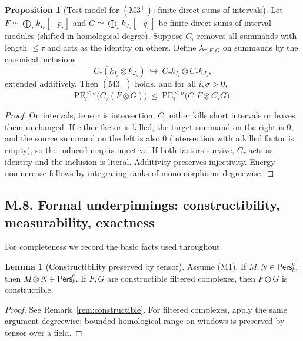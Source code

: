 \documentclass[11pt]{article}
\numberwithin{equation}{section}
\theoremstyle{plain}
\theoremstyle{definition}
\theoremstyle{remark}
\newcommand{\Pers}{\mathsf{Pers}}
\theoremstyle{plain}
\theoremstyle{definition}
\newcommand{\kk}{k}
\newcommand{\PE}{\mathrm{PE}}
\newcommand{\CT}{C_{\tau}}
\numberwithin{equation}{section}
\newtheorem{proposition}[theorem]{Proposition}
\newtheorem{lemma}[theorem]{Lemma}
\theoremstyle{definition}
\numberwithin{equation}{section}
\theoremstyle{plain}
\theoremstyle{definition}
\theoremstyle{remark}
\begin{document}
\begin{proposition}[Test model for \((\mathrm{M3}^+)\): finite direct sums of intervals]\label{prop:test-m3plus}
Let \(F\simeq \bigoplus_r \kk_{I_r}[-p_r]\) and \(G\simeq \bigoplus_s \kk_{J_s}[-q_s]\) be finite direct sums of interval modules (shifted in homological degree). Suppose \(\CT\) removes all summands with length \(\le \tau\) and acts as the identity on others. Define \(\lambda_{\tau,F,G}\) on summands by the canonical inclusions
\[
  \CT(\kk_{I_r}\otimes\kk_{J_s})\ \hookrightarrow\ \CT\kk_{I_r}\otimes \CT\kk_{J_s},
\]
extended additively. Then \((\mathrm{M3}^+)\) holds, and for all \(i,\sigma>0\),
\[
  \PE_i^{\le \sigma}\big(\CT(F\otimes G)\big)\ \le\ \PE_i^{\le \sigma}\big(\CT F\otimes \CT G\big).
\]
\end{proposition}

\begin{proof}
On intervals, tensor is intersection; \(\CT\) either kills short intervals or leaves them unchanged. If either factor is killed, the target summand on the right is \(0\), and the source summand on the left is also \(0\) (intersection with a killed factor is empty), so the induced map is injective. If both factors survive, \(\CT\) acts as identity and the inclusion is literal. Additivity preserves injectivity. Energy nonincrease follows by integrating ranks of monomorphisms degreewise.
\end{proof}

\bigskip

\subsection*{M.8. Formal underpinnings: constructibility, measurability, exactness}

For completeness we record the basic facts used throughout.

\begin{lemma}[Constructibility preserved by tensor]\label{lem:constructible-tensor}
Assume (M1). If \(M,N\in \Pers^\mathrm{c}_\kk\), then \(M\otimes N\in \Pers^\mathrm{c}_\kk\). If \(F,G\) are constructible filtered complexes, then \(F\otimes G\) is constructible.
\end{lemma}

\begin{proof}
See Remark~\ref{rem:constructible}. For filtered complexes, apply the same argument degreewise; bounded homological range on windows is preserved by tensor over a field.
\end{proof}
\end{document}
